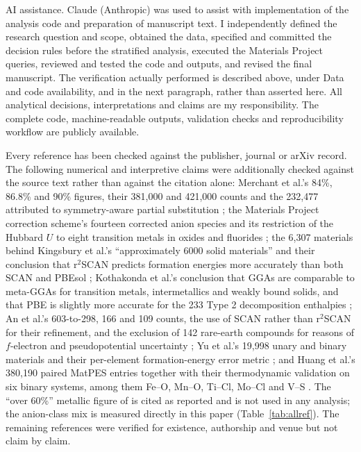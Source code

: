 \documentclass[11pt]{article}
\begin{document}
AI assistance. Claude (Anthropic) was used to assist with implementation of the analysis
code and preparation of manuscript text. I independently defined the research question and
scope, obtained the data, specified and committed the decision rules before the stratified
analysis, executed the Materials Project queries, reviewed and tested the code and outputs,
and revised the final manuscript. The verification actually performed is described above, under
Data and code availability, and in the next paragraph, rather than asserted here. All
analytical decisions, interpretations and claims are my responsibility. The complete code,
machine-readable outputs, validation checks and reproducibility workflow are publicly
available.

Every reference has been checked against the publisher, journal or arXiv record. The following
numerical and interpretive claims were additionally checked against the source text rather
than against the citation alone: Merchant et al.'s 84\%, 86.8\% and 90\% figures, their
381{,}000 and 421{,}000 counts and the 232{,}477 attributed to symmetry-aware partial
substitution \citep{merchant2023}; the Materials Project correction scheme's fourteen
corrected anion species and its restriction of the Hubbard $U$ to eight transition metals
in oxides and fluorides \citep{mpanion}; the 6{,}307 materials behind Kingsbury et al.'s ``approximately 6000
solid materials'' and their conclusion that r$^2$SCAN predicts formation energies more accurately
than both SCAN and PBEsol \citep{kingsbury2022prm}; Kothakonda et al.'s conclusion that
GGAs are comparable to meta-GGAs for transition metals, intermetallics and weakly bound
solids, and that PBE is slightly more accurate for the 233 Type 2 decomposition enthalpies
\citep{kothakonda2023}; An et al.'s 603-to-298, 166 and 109 counts, the use of SCAN rather
than r$^2$SCAN for their refinement, and the exclusion of 142 rare-earth compounds for
reasons of $f$-electron and pseudopotential uncertainty \citep{an2026}; Yu et al.'s 19{,}998
unary and binary materials and their per-element formation-energy error metric
\citep{yu2024}; and Huang et al.'s 380{,}190 paired MatPES entries together with their
thermodynamic validation on six binary systems, among them Fe--O, Mn--O, Ti--Cl, Mo--Cl
and V--S \citep{huang2026}. The ``over 60\%'' metallic figure of \citet{liu2024} is cited as reported and is not used in any analysis; the anion-class mix
is measured directly in this paper (Table~\ref{tab:allref}). The remaining references were
verified for existence, authorship and venue but not claim by claim.
\end{document}
